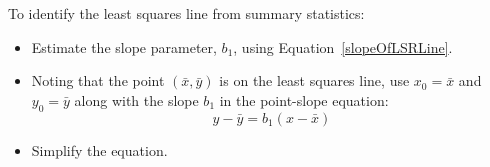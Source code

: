 \begin{tipBox}{
To identify the least squares line from summary statistics:\vspace{-1mm}
\begin{itemize}
\setlength{\itemsep}{0mm}
\item Estimate the slope parameter, $b_1$, using Equation~\eqref{slopeOfLSRLine}.
\item Noting that the point $(\bar{x}, \bar{y})$ is on the least squares line, use $x_0=\bar{x}$ and $y_0=\bar{y}$ along with the slope $b_1$ in the point-slope equation:
$$y - \bar{y} = b_1 (x - \bar{x}) $$
\item Simplify the equation.\vspace{0.5mm}
\end{itemize}}
\end{tipBox}






